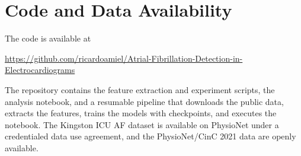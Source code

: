 \documentclass[conference,a4paper]{IEEEtran}
\begin{document}
\section*{Code and Data Availability}

The code is available at
\begin{center}\small\url{https://github.com/ricardoamiel/Atrial-Fibrillation-Detection-in-Electrocardiograms}\end{center}
The repository contains the feature extraction and experiment scripts, the analysis notebook, and a resumable pipeline that downloads the public data, extracts the features, trains the models with checkpoints, and executes the notebook. The Kingston ICU AF dataset is available on PhysioNet under a credentialed data use agreement, and the PhysioNet/CinC 2021 data are openly available.
\end{document}
